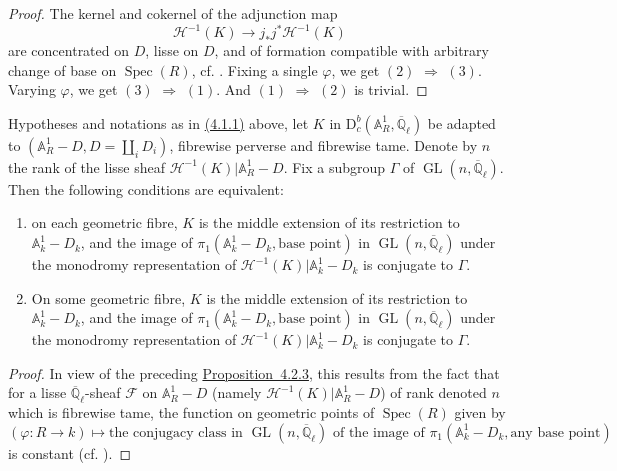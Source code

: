 \begin{proof}
The kernel and cokernel of the adjunction map
\[
  \mathcal{H}^{-1}(K)\to j_*j^*\mathcal{H}^{-1}(K)
\]
are concentrated on \(D\), lisse on \(D\), and of formation compatible with
arbitrary change of base on \(\operatorname{Spec}(R)\), cf.
\cite[4.7.2--3]{Ka-SE}. Fixing a single \(\varphi\), we get
\((2)\) \(\Rightarrow\) \((3)\). Varying \(\varphi\), we get \((3)\) \(\Rightarrow\) \((1)\).
And \((1)\) \(\Rightarrow\) \((2)\) is trivial.
\end{proof}

Hypotheses and notations as in \hyperref[par:4.1.1]{(4.1.1)} above, let \(K\)
in \(\mathrm{D}^b_c(\mathbb{A}^1_R,\overline{\mathbb{Q}}_\ell)\) be adapted to
\((\mathbb{A}^1_R-D,D=\coprod_iD_i)\), fibrewise perverse and fibrewise tame.
Denote by \(n\) the rank of the lisse sheaf
\(\mathcal{H}^{-1}(K)\vert\mathbb{A}^1_R-D\). Fix a subgroup
\(\Gamma\) of \(\operatorname{GL}(n,\overline{\mathbb{Q}}_\ell)\). Then the
following conditions are equivalent:
\begin{enumerate}[label=(\arabic*)]
\item on each geometric fibre, \(K\) is the middle extension of its restriction
to \(\mathbb{A}^1_k-D_k\), and the image of
\(\pi_1(\mathbb{A}^1_k-D_k,\text{base point})\) in
\(\operatorname{GL}(n,\overline{\mathbb{Q}}_\ell)\) under the monodromy
representation of
\(\mathcal{H}^{-1}(K)\vert\mathbb{A}^1_k-D_k\) is conjugate to \(\Gamma\).
\item On some geometric fibre, \(K\) is the middle extension of its restriction
to \(\mathbb{A}^1_k-D_k\), and the image of
\(\pi_1(\mathbb{A}^1_k-D_k,\text{base point})\) in
\(\operatorname{GL}(n,\overline{\mathbb{Q}}_\ell)\) under the monodromy
representation of
\(\mathcal{H}^{-1}(K)\vert\mathbb{A}^1_k-D_k\) is conjugate to \(\Gamma\).
\end{enumerate}

\begin{proof}
In view of the preceding \hyperref[prop:4.2.3]{Proposition~4.2.3}, this results from the fact that for a lisse
\(\overline{\mathbb{Q}}_\ell\)-sheaf \(\mathcal{F}\) on
\(\mathbb{A}^1_R-D\) (namely
\(\mathcal{H}^{-1}(K)\vert\mathbb{A}^1_R-D\)) of rank denoted \(n\) which is
fibrewise tame, the function on geometric points of \(\operatorname{Spec}(R)\)
given by
\[
  (\varphi:R\to k)\longmapsto
  \text{the conjugacy class in }\operatorname{GL}(n,\overline{\mathbb{Q}}_\ell)
  \text{ of the image of }
  \pi_1(\mathbb{A}^1_k-D_k,\text{any base point})
\]
is constant (cf. \cite[8.17.13]{Ka-ESDE}).
\end{proof}

